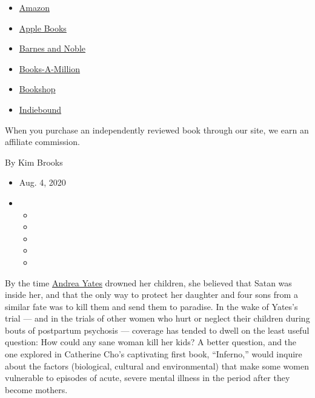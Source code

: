\begin{itemize}
\tightlist
\item
  \href{https://www.amazon.com/gp/search?index=books\&tag=NYTBSREV-20\&field-keywords=Inferno\%3A+A+Memoir+of+Motherhood+and+Madness+Catherine+Cho}{Amazon}
\item
  \href{https://du-gae-books-dot-nyt-du-prd.appspot.com/buy?title=Inferno\%3A+A+Memoir+of+Motherhood+and+Madness\&author=Catherine+Cho}{Apple
  Books}
\item
  \href{https://www.anrdoezrs.net/click-7990613-11819508?url=https\%3A\%2F\%2Fwww.barnesandnoble.com\%2Fw\%2F\%3Fean\%3D9781250623713}{Barnes
  and Noble}
\item
  \href{https://www.anrdoezrs.net/click-7990613-35140?url=https\%3A\%2F\%2Fwww.booksamillion.com\%2Fp\%2FInferno\%253A\%2BA\%2BMemoir\%2Bof\%2BMotherhood\%2Band\%2BMadness\%2FCatherine\%2BCho\%2F9781250623713}{Books-A-Million}
\item
  \href{https://bookshop.org/a/3546/9781250623713}{Bookshop}
\item
  \href{https://www.indiebound.org/book/9781250623713?aff=NYT}{Indiebound}
\end{itemize}

When you purchase an independently reviewed book through our site, we
earn an affiliate commission.

By Kim Brooks

\begin{itemize}
\item
  Aug. 4, 2020
\item
  \begin{itemize}
  \item
  \item
  \item
  \item
  \item
  \end{itemize}
\end{itemize}

By the time
\href{https://www.nytimes.com/2001/09/08/us/despair-plagued-mother-held-in-children-s-deaths.html}{Andrea
Yates} drowned her children, she believed that Satan was inside her, and
that the only way to protect her daughter and four sons from a similar
fate was to kill them and send them to paradise. In the wake of Yates's
trial --- and in the trials of other women who hurt or neglect their
children during bouts of postpartum psychosis --- coverage has tended to
dwell on the least useful question: How could any sane woman kill her
kids? A better question, and the one explored in Catherine Cho's
captivating first book, ``Inferno,'' would inquire about the factors
(biological, cultural and environmental) that make some women vulnerable
to episodes of acute, severe mental illness in the period after they
become mothers.

